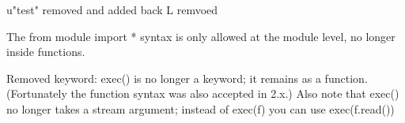 

u"test" removed and added back
L remvoed

The from module import * syntax is only allowed at the module level, no longer inside functions.

Removed keyword: exec() is no longer a keyword; it remains as a function. (Fortunately the function syntax was also accepted in 2.x.) Also note that exec() no longer takes a stream argument; instead of exec(f) you can use exec(f.read())

